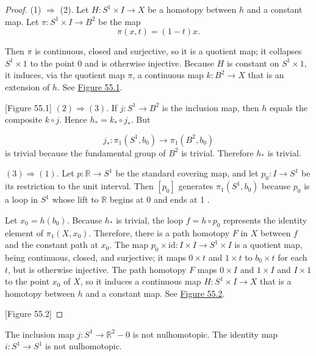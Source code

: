 \begin{proof}
(1) \(\Rightarrow\) (2). Let \(H : S^{1} \times I \rightarrow X\) be a homotopy between \(h\) and a constant map. Let \(\pi : S^{1} \times I \rightarrow {B}^{2}\) be the map
\[
\pi ( {x,t}) = ( {1 - t}) x.
\]

Then \(\pi\) is continuous, closed and surjective, so it is a quotient map; it collapses \(S^{1} \times 1\) to the point 0 and is otherwise injective. Because \(H\) is constant on \(S^{1} \times 1\), it induces, via the quotient map \(\pi\), a continuous map \(k : B^{2} \rightarrow X\) that is an extension of \(h\). See \hyperref[fig:55.1]{Figure 55.1}.

[Figure 55.1]
\((2) \Rightarrow ( 3)\). If \(j : S^{1} \rightarrow {B}^{2}\) is the inclusion map, then \(h\) equals the composite \(k \circ j\). Hence \(h_{ * } = k_{ * } \circ {j}_{ * }\). But

\[
j_{ * } : {\pi }_{1}( {S^{1},b_{0}}) \rightarrow {\pi }_{1}( {B^{2},b_{0}})
\]
is trivial because the fundamental group of \(B^{2}\) is trivial. Therefore \(h_{ * }\) is trivial.

\(( 3) \Rightarrow (1)\). Let \(p : \mathbb{R} \rightarrow {S}^{1}\) be the standard covering map, and let \(p_{0} : I \rightarrow {S}^{1}\) be its restriction to the unit interval. Then \([ p_{0}]\) generates \({\pi }_{1}( {S^{1},b_{0}})\) because \(p_{0}\) is a loop in \(S^{1}\) whose lift to \(\mathbb{R}\) begins at 0 and ends at 1 .

Let \(x_{0} = h( b_{0})\). Because \(h_{ * }\) is trivial, the loop \(f = h \circ {p}_{0}\) represents the identity element of \({\pi }_{1}( {X,x_{0}})\). Therefore, there is a path homotopy \(F\) in \(X\) between \(f\) and the constant path at \(x_{0}\). The map \(p_{0} \times \mathrm{id} : I \times I \rightarrow {S}^{1} \times I\) is a quotient map, being continuous, closed, and surjective; it maps \(0 \times t\) and \(1 \times t\) to \(b_{0} \times t\) for each \(t\), but is otherwise injective. The path homotopy \(F\) maps \(0 \times I\) and \(1 \times I\) and \(I \times 1\) to the point \(x_{0}\) of \(X\), so it induces a continuous map \(H : S^{1} \times I \rightarrow X\) that is a homotopy between \(h\) and a constant map. See \hyperref[fig:55.2]{Figure 55.2}.

[Figure 55.2]
\end{proof}
\begin{corollary}
\label{cor:\thetheorem}
The inclusion map \(j : S^{1} \rightarrow {\mathbb{R}}^{2} - 0\) is not nulhomotopic. The identity map \(i : S^{1} \rightarrow {S}^{1}\) is not nulhomotopic.
\end{corollary}

